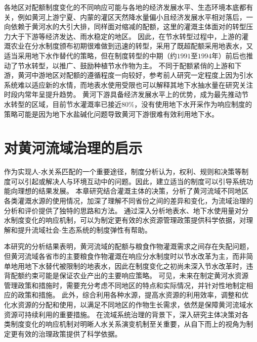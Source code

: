 各地区对配额制度变化的不同响应可能与各地的经济发展水平、生态环境本底都有关，例如黄河上游宁夏、内蒙的灌区天然降水量偏小且经济发展水平相对落后，一向依赖于黄河水的大引大排，同样面对缩减的配额，这里的灌溉主体面对的转型压力大于下游等经济发达、雨水稳定的地区。
因此，在节水转型过程中，上游的灌溉农业在分水制度颁布初期很难做到迅速的转型，采用了既超配额采用地表水，又适当采用地下水作替代的策略，但在制度转型的中期（约$1991$至$1994$年）前后也推动了节水转型，以推广、鼓励种植节水作物为主。
不同于配额紧俏的上游和下游，黄河中游地区对配额的遵循程度一向较好，参考前人研究一定程度上因为引水系统难以适应新的水情，而地表水使用受限也可以解释其地下水抽水量在研究关注时段内常年呈提升趋势。
黄河下游具备经济发展水平上的优势，成为最先推动节水转型的区域，目前节水灌溉率已接近$80\%$，没有使用地下水开采作为响应制度的策略可能是因为地下水盐碱化问题导致黄河下游很难有效利用地下水。

\section{对黄河流域治理的启示}

作为实现人-水关系匹配的一个重要途径，制度分析认为，权利、规则和决策等制度可以引起或解决人与环境互动中的问题。因此，建立适当的制度可以引导系统功能向理想的结果发展。
本章研究结合灌溉主体的决策，分析了黄河流域不同地区各类灌溉水源的使用情况，加深了理解不同省份之间的差异和变化，为流域治理的分析和评价提供了独特的思路和方法。
通过深入分析地表水、地下水使用量对分水制度变化的响应机制，可以为制定更有效的水资源管理政策提供科学依据，对理解和提升流域社会-生态系统的制度弹性有帮助。

本研究的分析结果表明，黄河流域的配额与粮食作物灌溉需求之间存在失配问题，但黄河流域各省市的主要粮食作物灌溉在响应分水制度时以节水改革为主，而非简单地用地下水替代被限制的地表水，因此在制度变化之初尚未深入节水改革时，违背配额约束可能是保证农业产出的主要响应策略。
可见，未来在制定黄河水资源管理政策和措施时，需要充分考虑不同地区的特点和实际情况，并针对性地制定相应的政策和措施。
此外，综合利用各种水源，提高水资源的利用效率，调整和优化水资源的分配和使用，以满足不同地区的作物生长需求，依然是保障黄河流域水资源可持续利用的重要措施。
在流域系统治理的背景下，深入研究主体决策对各类制度变化的响应机制对明晰人水关系演变机制至关重要，从自下而上的视角为制定更有效的治理政策提供了科学依据。


